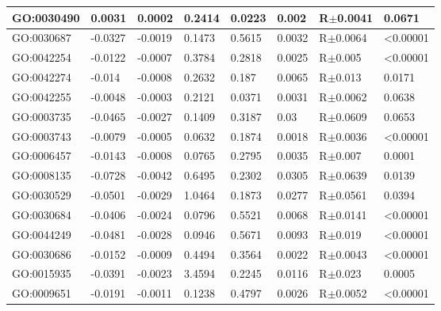 \documentclass[a4,center]{NAR} %
\begin{document}
\begin{table}[t]
{\begin{tabular} {|l|l|l|l|l|l|l|l|}
\hline
GO:0030490&0.0031&0.0002&0.2414&0.0223&0.002   &R$\pm$0.0041&0.0671\\
\hline
GO:0030687&-0.0327&-0.0019&0.1473&0.5615&0.0032  &R$\pm$0.0064&\textless 0.00001\\
\hline
GO:0042254&-0.0122&-0.0007&0.3784&0.2818&0.0025  &R$\pm$0.005&\textless 0.00001\\
\hline
GO:0042274&-0.014&-0.0008&0.2632&0.187&0.0065  &R$\pm$0.013&0.0171\\
\hline
GO:0042255&-0.0048& -0.0003& 0.2121 & 0.0371 & 0.0031 & R$\pm$0.0062  &0.0638   \\
\hline
GO:0003735 & -0.0465 &-0.0027& 0.1409 & 0.3187 & 0.03  &  R$\pm$0.0609  &  0.0653 \\
\hline
GO:0003743 &-0.0079 &-0.0005& 0.0632 & 0.1874 & 0.0018  &R$\pm$0.0036 & \textless 0.00001  \\
\hline
GO:0006457& -0.0143& -0.0008& 0.0765 & 0.2795&  0.0035&  R$\pm$0.007& 0.0001\\
\hline
GO:0008135&-0.0728 &-0.0042& 0.6495&0.2302 & 0.0305 & R$\pm$0.0639  &  0.0139 \\
\hline
GO:0030529&-0.0501& -0.0029 &1.0464&  0.1873 & 0.0277 & R$\pm$0.0561  & 0.0394   \\
\hline
GO:0030684&-0.0406&-0.0024&0.0796&0.5521&0.0068&R$\pm$0.0141& \textless 0.00001  \\
\hline
GO:0044249&-0.0481& -0.0028 &0.0946 & 0.5671  &0.0093 & R$\pm$0.019 & \textless 0.00001  \\
\hline
GO:0030686&-0.0152& -0.0009& 0.4494&0.3564 & 0.0022&R$\pm$0.0043 &  \textless 0.00001  \\
\hline
GO:0015935&-0.0391&-0.0023&3.4594&0.2245&0.0116  &R$\pm$0.023&0.0005  \\
\hline
GO:0009651&-0.0191 &-0.0011 &0.1238  &0.4797&  0.0026&  R$\pm$0.0052 &    \textless 0.00001 \\
\hline
\end{tabular}%
}

\end{table}
\end{document}

